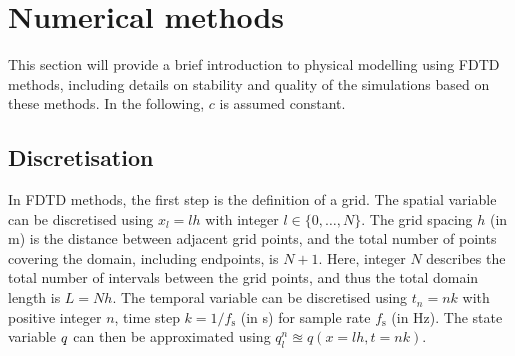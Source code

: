 \section{Numerical methods}\label{sec:FDTD}
This section will provide a brief introduction to physical modelling using FDTD methods, including details on stability and quality of the simulations based on these methods. In the following, $c$ is assumed constant.

\subsection{Discretisation}
In FDTD methods, the first step is the definition of a grid. The spatial variable can be discretised using $x_l = lh$ %
with integer $l \in \{0, \hdots, N\}$. The grid spacing $h$ (in m) is the distance between adjacent grid points, and the total number of points covering the domain, including endpoints, is $N + 1$. Here, integer $N$ describes the total number of intervals between the grid points, and thus the total domain length is $L=Nh$.
The temporal variable can be discretised using $t_n = nk$ with positive integer $n$, time step $k = 1/f_\text{s}$ (in s) for sample rate $f_\text{s}$ (in Hz). The state variable $q$ can then be approximated using 
$q_{l}^{n}\approxeq q(x=lh,t=nk)$. 

